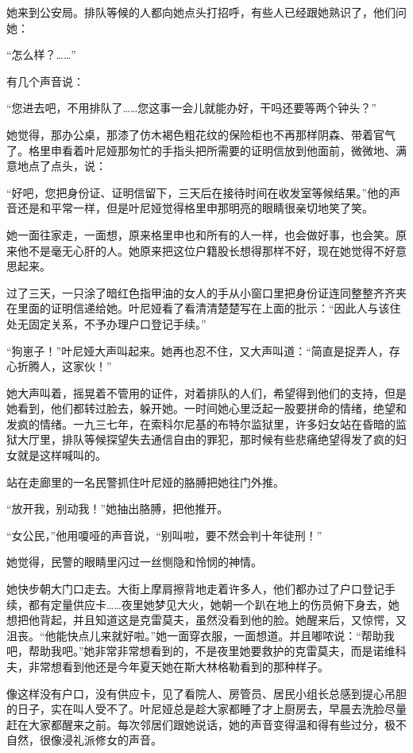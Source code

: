 她来到公安局。排队等候的人都向她点头打招呼，有些人已经跟她熟识了，他们问她：

“怎么样？……”

有几个声音说：

“您进去吧，不用排队了……您这事一会儿就能办好，干吗还要等两个钟头？”

她觉得，那办公桌，那漆了仿木褐色粗花纹的保险柜也不再那样阴森、带着官气了。格里申看着叶尼娅那匆忙的手指头把所需要的证明信放到他面前，微微地、满意地点了点头，说：

“好吧，您把身份证、证明信留下，三天后在接待时间在收发室等候结果。”他的声音还是和平常一样，但是叶尼娅觉得格里申那明亮的眼睛很亲切地笑了笑。

她一面往家走，一面想，原来格里申也和所有的人一样，也会做好事，也会笑。原来他不是毫无心肝的人。她原来把这位户籍股长想得那样不好，现在她觉得不好意思起来。

过了三天，一只涂了暗红色指甲油的女人的手从小窗口里把身份证连同整整齐齐夹在里面的证明信递给她。叶尼娅看了看清清楚楚写在上面的批示：“因此人与该住处无固定关系，不予办理户口登记手续。”

“狗崽子！”叶尼娅大声叫起来。她再也忍不住，又大声叫道：“简直是捉弄人，存心折腾人，这家伙！”

她大声叫着，摇晃着不管用的证件，对着排队的人们，希望得到他们的支持，但是她看到，他们都转过脸去，躲开她。一时间她心里泛起一股要拼命的情绪，绝望和发疯的情绪。一九三七年，在索科尔尼基的布特尔监狱里，许多妇女站在昏暗的监狱大厅里，排队等候探望失去通信自由的罪犯，那时候有些悲痛绝望得发了疯的妇女就是这样喊叫的。

站在走廊里的一名民警抓住叶尼娅的胳膊把她往门外推。

“放开我，别动我！”她抽出胳膊，把他推开。

“女公民，”他用嗄哑的声音说，“别叫啦，要不然会判十年徒刑！”

她觉得，民警的眼睛里闪过一丝恻隐和怜悯的神情。

她快步朝大门口走去。大街上摩肩擦背地走着许多人，他们都办过了户口登记手续，都有定量供应卡……夜里她梦见大火，她朝一个趴在地上的伤员俯下身去，她想把他背起，并且知道这是克雷莫夫，虽然没看到他的脸。她醒来后，又惊愕，又沮丧。“他能快点儿来就好啦。”她一面穿衣服，一面想道。并且嘟哝说：“帮助我吧，帮助我吧。”她非常非常想看到的，不是夜里她要救护的克雷莫夫，而是诺维科夫，非常想看到他还是今年夏天她在斯大林格勒看到的那种样子。

像这样没有户口，没有供应卡，见了看院人、房管员、居民小组长总感到提心吊胆的日子，实在叫人受不了。叶尼娅总是趁大家都睡了才上厨房去，早晨去洗脸尽量赶在大家都醒来之前。每次邻居们跟她说话，她的声音变得温和得有些过分，极不自然，很像浸礼派修女的声音。

